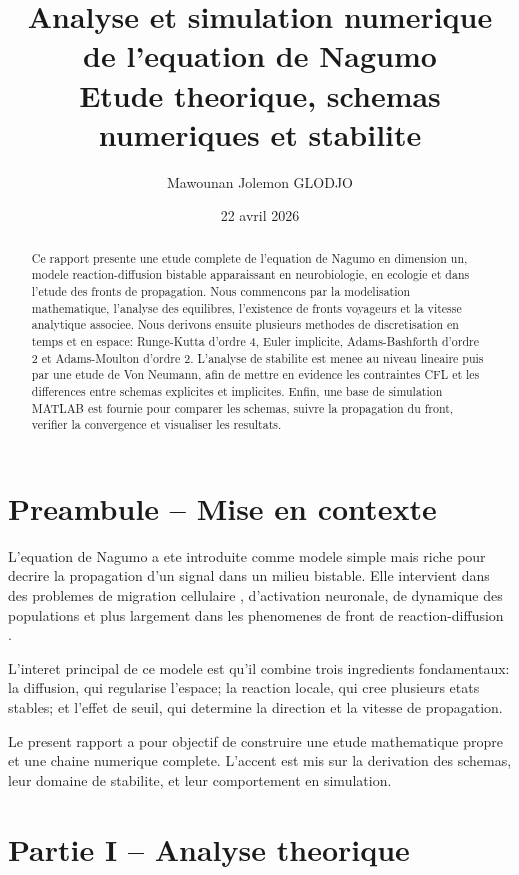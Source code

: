 \documentclass[11pt,a4paper]{report}
\title{Analyse et simulation numerique de l'equation de Nagumo\\
\large Etude theorique, schemas numeriques et stabilite}
\author{Mawounan Jolemon GLODJO}
\date{22 avril 2026}
\begin{document}
\maketitle

\begin{abstract}
Ce rapport presente une etude complete de l'equation de Nagumo en dimension un,
modele reaction-diffusion bistable apparaissant en neurobiologie, en ecologie et dans
l'etude des fronts de propagation.
Nous commencons par la modelisation mathematique, l'analyse des equilibres, l'existence
de fronts voyageurs et la vitesse analytique associee.
Nous derivons ensuite plusieurs methodes de discretisation en temps et en espace:
Runge-Kutta d'ordre 4, Euler implicite, Adams-Bashforth d'ordre 2 et Adams-Moulton d'ordre 2.
L'analyse de stabilite est menee au niveau lineaire puis par une etude de Von Neumann,
afin de mettre en evidence les contraintes CFL et les differences entre schemas explicites
et implicites.
Enfin, une base de simulation MATLAB est fournie pour comparer les schemas, suivre la
propagation du front, verifier la convergence et visualiser les resultats.
\end{abstract}

\tableofcontents

\chapter*{Preambule -- Mise en contexte}
L'equation de Nagumo a ete introduite \cite{Nagumo1962} comme modele simple mais riche pour decrire la
propagation d'un signal dans un milieu bistable. Elle intervient dans des problemes de
migration cellulaire \cite{MurrayMathematicalBiology}, d'activation neuronale, de dynamique des populations et plus
largement dans les phenomenes de front de reaction-diffusion \cite{Volpert2000}.

L'interet principal de ce modele est qu'il combine trois ingredients fondamentaux:
la diffusion, qui regularise l'espace; la reaction locale, qui cree plusieurs etats
stables; et l'effet de seuil, qui determine la direction et la vitesse de propagation.

Le present rapport a pour objectif de construire une etude mathematique propre et une
chaine numerique complete. L'accent est mis sur la derivation des schemas, leur domaine
de stabilite, et leur comportement en simulation.

\chapter{Partie I -- Analyse theorique}
\end{document}
